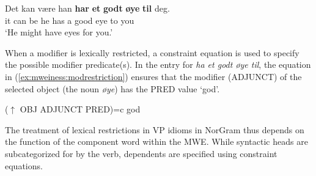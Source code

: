 \documentclass[output=paper]{langsci/langscibook}
\begin{document}
\ea\label{ex:mweiness:haøyetil}
\gll Det kan være han \textbf{har} \textbf{et} \textbf{godt} \textbf{øye} \textbf{til} deg. \\
it can be he has a good eye to you \\
\glt `He might have eyes for you.' 
\z

When a modifier is lexically restricted, a constraint equation is used to specify the possible modifier predicate(s).
In the entry for \emph{ha et godt øye til}, the equation in (\ref{ex:mweiness:modrestriction}) ensures that the modifier (ADJUNCT) of the selected object (the noun \emph{øye}) has the PRED value `god'. 

\ea\label{ex:mweiness:modrestriction}
{\small 
($\uparrow$ OBJ ADJUNCT PRED)=c god \\
}
\z

The treatment of lexical restrictions in VP idioms in NorGram thus depends on the function of the component word within the MWE. 
While syntactic heads are subcategorized for by the verb, dependents are specified using constraint equations.

  
\end{document}
